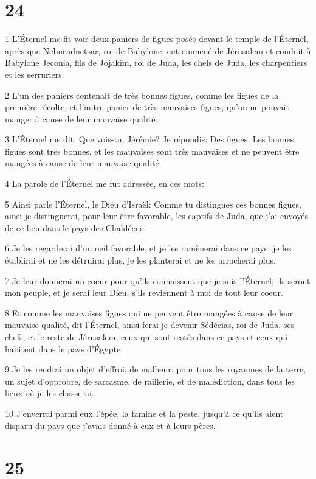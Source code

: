 \chapter{24}

\par 1 L'Éternel me fit voir deux paniers de figues posés devant le temple de l'Éternel, après que Nebucadnetsar, roi de Babylone, eut emmené de Jérusalem et conduit à Babylone Jeconia, fils de Jojakim, roi de Juda, les chefs de Juda, les charpentiers et les serruriers.
\par 2 L'un des paniers contenait de très bonnes figues, comme les figues de la première récolte, et l'autre panier de très mauvaises figues, qu'on ne pouvait manger à cause de leur mauvaise qualité.
\par 3 L'Éternel me dit: Que vois-tu, Jérémie? Je répondis: Des figues, Les bonnes figues sont très bonnes, et les mauvaises sont très mauvaises et ne peuvent être mangées à cause de leur mauvaise qualité.
\par 4 La parole de l'Éternel me fut adressée, en ces mots:
\par 5 Ainsi parle l'Éternel, le Dieu d'Israël: Comme tu distingues ces bonnes figues, ainsi je distinguerai, pour leur être favorable, les captifs de Juda, que j'ai envoyés de ce lieu dans le pays des Chaldéens.
\par 6 Je les regarderai d'un oeil favorable, et je les ramènerai dans ce pays; je les établirai et ne les détruirai plus, je les planterai et ne les arracherai plus.
\par 7 Je leur donnerai un coeur pour qu'ils connaissent que je suis l'Éternel; ils seront mon peuple, et je serai leur Dieu, s'ils reviennent à moi de tout leur coeur.
\par 8 Et comme les mauvaises figues qui ne peuvent être mangées à cause de leur mauvaise qualité, dit l'Éternel, ainsi ferai-je devenir Sédécias, roi de Juda, ses chefs, et le reste de Jérusalem, ceux qui sont restés dans ce pays et ceux qui habitent dans le pays d'Égypte.
\par 9 Je les rendrai un objet d'effroi, de malheur, pour tous les royaumes de la terre, un sujet d'opprobre, de sarcasme, de raillerie, et de malédiction, dans tous les lieux où je les chasserai.
\par 10 J'enverrai parmi eux l'épée, la famine et la peste, jusqu'à ce qu'ils aient disparu du pays que j'avais donné à eux et à leurs pères.

\chapter{25}


